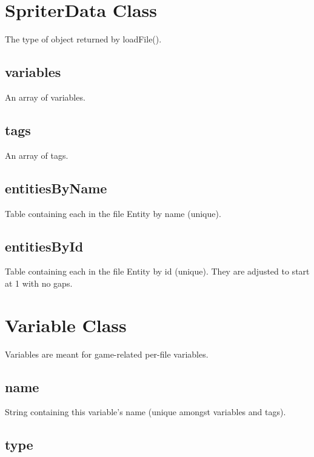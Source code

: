 \documentclass{article}
\begin{document}
\newpage

		\section{SpriterData Class}

The type of object returned by loadFile().


\subsection{variables}

An array of variables.


\subsection{tags}

An array of tags.


\subsection{entitiesByName}

Table containing each in the file Entity by name (unique).


\subsection{entitiesById}

Table containing each in the file Entity by id (unique). They are adjusted to start at 1 with no gaps.



\newpage

		\section{Variable Class}

Variables are meant for game-related per-file variables.


\subsection{name}

String containing this variable's name (unique amongst variables and tags).


\subsection{type}
\end{document}

